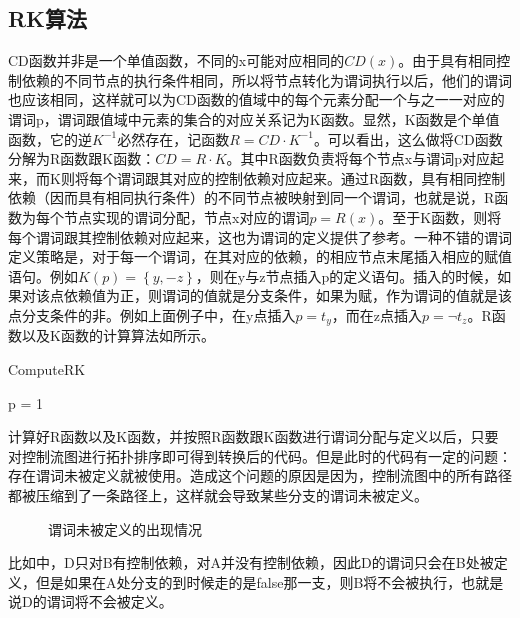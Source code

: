 \subsection{RK算法}

CD函数并非是一个单值函数，不同的x可能对应相同的$CD\left(x\right)$。由于具有相同控制依赖的不同节点的执行条件相同，所以将节点转化为谓词执行以后，他们的谓词也应该相同，这样就可以为CD函数的值域中的每个元素分配一个与之一一对应的谓词p，谓词跟值域中元素的集合的对应关系记为K函数。显然，K函数是个单值函数，它的逆$K^{-1}$必然存在，记函数$R=CD\cdot K^{-1}$。可以看出，这么做将CD函数分解为R函数跟K函数：$CD=R\cdot K$。其中R函数负责将每个节点x与谓词p对应起来，而K则将每个谓词跟其对应的控制依赖对应起来。通过R函数，具有相同控制依赖（因而具有相同执行条件）的不同节点被映射到同一个谓词，也就是说，R函数为每个节点实现的谓词分配，节点x对应的谓词$p=R\left(x\right)$。至于K函数，则将每个谓词跟其控制依赖对应起来，这也为谓词的定义提供了参考。一种不错的谓词定义策略是，对于每一个谓词，在其对应的依赖，的相应节点末尾插入相应的赋值语句。例如$K\left(p\right)=\left\{y,-z\right\}$，则在y与z节点插入p的定义语句。插入的时候，如果对该点依赖值为正，则谓词的值就是分支条件，如果为赋，作为谓词的值就是该点分支条件的非。例如上面例子中，在y点插入$p=t_y$，而在z点插入$p=\neg t_z$。R函数以及K函数的计算算法如所示。

\begin{algorithm}[H]
	\label{alg:ComputeRK}
	\caption{ComputeRK}
	p = 1
\end{algorithm}
计算好R函数以及K函数，并按照R函数跟K函数进行谓词分配与定义以后，只要对控制流图进行拓扑排序即可得到转换后的代码。但是此时的代码有一定的问题：存在谓词未被定义就被使用。造成这个问题的原因是因为，控制流图中的所有路径都被压缩到了一条路径上，这样就会导致某些分支的谓词未被定义。
\begin{wrapfigure}{l}{0pt}
\caption{谓词未被定义的出现情况}\label{fig:pundef}
\end{wrapfigure}
比如中，D只对B有控制依赖，对A并没有控制依赖，因此D的谓词只会在B处被定义，但是如果在A处分支的到时候走的是false那一支，则B将不会被执行，也就是说D的谓词将不会被定义。

